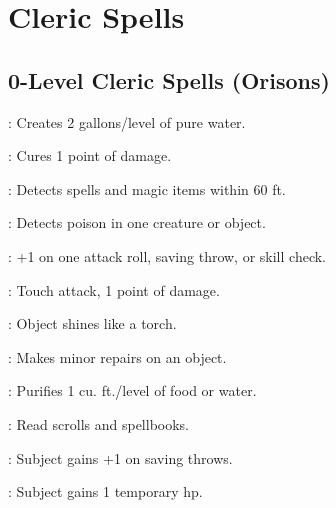 \section{Cleric Spells}

\begin{multicols}{2}

\subsection{0-Level Cleric Spells (Orisons)}
\begin{description*}
\item[\linkspell{Create Water}:] Creates 2 gallons/level of pure water.
\item[\linkspell{Cure Minor Wounds}:] Cures 1 point of damage.
\item[\linkspell{Detect Magic}:] Detects spells and magic items within 60 ft.
\item[\linkspell{Detect Poison}:] Detects poison in one creature or object.
\item[\linkspell{Guidance}:] +1 on one attack roll, saving throw, or skill check.
\item[\linkspell{Inflict Minor Wounds}:] Touch attack, 1 point of damage.
\item[\linkspell{Light}:] Object shines like a torch.
\item[\linkspell{Mending}:] Makes minor repairs on an object.
\item[\linkspell{Purify Food and Drink}:] Purifies 1 cu. ft./level of food or water.
\item[\linkspell{Read Magic}:] Read scrolls and spellbooks.
\item[\linkspell{Resistance}:] Subject gains +1 on saving throws.
\item[\linkspell{Virtue}:] Subject gains 1 temporary hp.
\end{description*}


\end{multicols}
